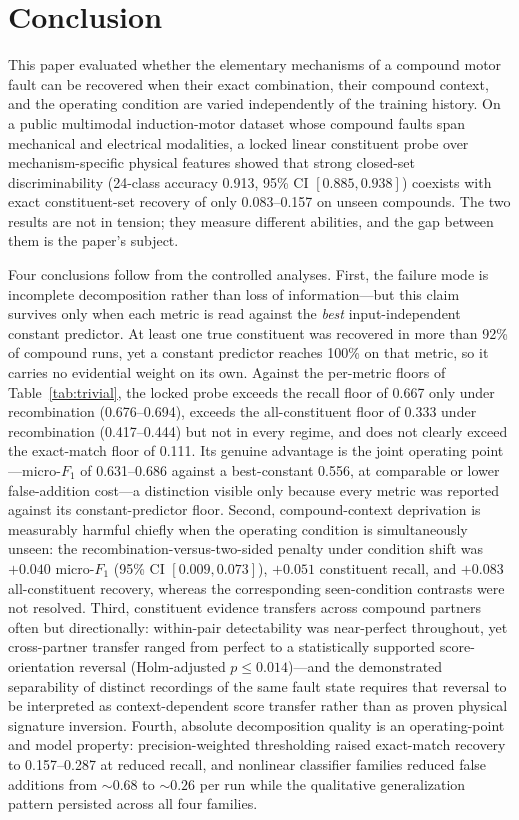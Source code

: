 \section{Conclusion}
\label{sec:conclusion}

This paper evaluated whether the elementary mechanisms of a compound motor
fault can be recovered when their exact combination, their compound
context, and the operating condition are varied independently of the
training history. On a public multimodal induction-motor dataset whose
compound faults span mechanical and electrical modalities, a locked linear
constituent probe over mechanism-specific physical features showed that
strong closed-set discriminability (24-class accuracy 0.913, 95\% CI
$[0.885, 0.938]$) coexists with exact constituent-set recovery of only
0.083--0.157 on unseen compounds. The two results are not in tension; they
measure different abilities, and the gap between them is the paper's
subject.

Four conclusions follow from the controlled analyses. First, the failure
mode is incomplete decomposition rather than loss of information---but this
claim survives only when each metric is read against the \emph{best}
input-independent constant predictor. At least one true constituent was
recovered in more than 92\% of compound runs, yet a constant predictor
reaches 100\% on that metric, so it carries no evidential weight on its
own. Against the per-metric floors of Table~\ref{tab:trivial}, the locked
probe exceeds the recall floor of 0.667 only under recombination
(0.676--0.694), exceeds the all-constituent floor of 0.333 under
recombination (0.417--0.444) but not in every regime, and does not clearly
exceed the exact-match floor of 0.111. Its genuine advantage is the joint
operating point---micro-$F_1$ of 0.631--0.686 against a best-constant
0.556, at comparable or lower false-addition cost---a distinction visible
only because every metric was reported against its constant-predictor
floor. Second, compound-context
deprivation is measurably harmful chiefly when the operating condition is
simultaneously unseen: the recombination-versus-two-sided penalty under
condition shift was $+0.040$ micro-$F_1$ (95\% CI $[0.009, 0.073]$),
$+0.051$ constituent recall, and $+0.083$ all-constituent recovery, whereas
the corresponding seen-condition contrasts were not resolved. Third,
constituent evidence transfers across compound partners often but
directionally: within-pair detectability was near-perfect throughout, yet
cross-partner transfer ranged from perfect to a statistically supported
score-orientation reversal (Holm-adjusted $p \le 0.014$)---and the
demonstrated separability of distinct recordings of the same fault state
requires that reversal to be interpreted as context-dependent score
transfer rather than as proven physical signature inversion. Fourth,
absolute decomposition quality is an operating-point and model property:
precision-weighted thresholding raised exact-match recovery to
0.157--0.287 at reduced recall, and nonlinear classifier families reduced
false additions from ${\sim}0.68$ to ${\sim}0.26$ per run while the
qualitative generalization pattern persisted across all four families.

